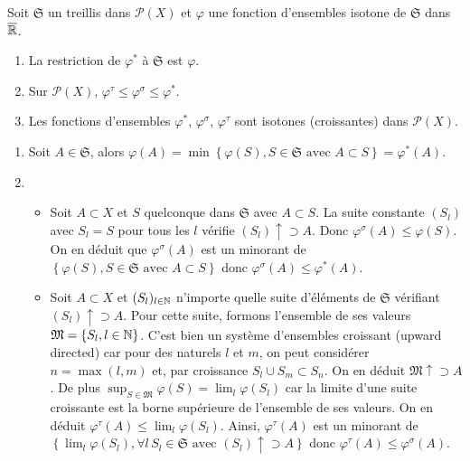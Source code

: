 \begin{prop}
Soit $\mathfrak{S}$ un treillis dans $\mathcal{P}(X)$ et $\varphi$ une fonction d'ensembles isotone de $\mathfrak{S}$ dans $\overline{\mathbb{R}}$.
 \begin{enumerate}
  \item  La restriction de $\varphi^*$ à $\mathfrak{S}$ est $\varphi$.
  \item Sur $\mathcal{P}(X)$, $\varphi^\tau \leq \varphi^\sigma \leq \varphi^*$.
  \item Les fonctions d'ensembles $\varphi^*$, $\varphi^\sigma$, $\varphi^\tau$ sont isotones (croissantes) dans $\mathcal{P}(X)$.
 \end{enumerate}
\end{prop}
\begin{demo}
 \begin{enumerate}
  \item Soit $A \in \mathfrak{S}$, alors $\varphi(A)= \min \left\lbrace \varphi(S), S \in \mathfrak{S} \text{ avec } A \subset S \right\rbrace = \varphi^*(A)$.
  \item \begin{itemize}
         \item Soit $A \subset X$ et $S$ quelconque dans $\mathfrak{S}$ avec $A \subset S$. La suite constante $(S_l)$ avec $S_l = S$ pour tous les $l$ vérifie $(S_l) \uparrow \supset A$. Donc $\varphi^\sigma(A) \leq \varphi(S)$. On en déduit que $\varphi^\sigma(A)$ est un minorant de $\left\lbrace \varphi(S), S \in \mathfrak{S} \text{ avec } A \subset S \right\rbrace$ donc $\varphi^\sigma(A) \leq \varphi^*(A)$.
        \item Soit $A \subset X$ et $(S_l)_{l\in \mathbb{N}}$ n'importe quelle suite d'éléments de $\mathfrak{S}$ vérifiant $(S_l) \uparrow \supset A$. Pour cette suite, formons l'ensemble de ses valeurs $\mathfrak{M}= \left\lbrace S_l, l\in \mathbb{N} \right\rbrace$. C'est bien un système d'ensembles croissant (upward directed) car pour des naturels $l$ et $m$, on peut considérer $n = \max(l,m)$ et, par croissance $S_l \cup S_m \subset S_n$. On en déduit $\mathfrak{M}\uparrow \supset A$. De plus $\sup_{S \in \mathfrak{M}} \varphi(S)=\lim_{l}  \varphi(S_l)$ car la limite d'une suite croissante est la borne supérieure de l'ensemble de ses valeurs. On en déduit $\varphi^\tau (A) \leq \lim_{l}  \varphi(S_l)$. Ainsi, $\varphi^\tau(A)$ est un minorant de $\left\lbrace \lim_{l}  \varphi(S_l), \forall l \, S_l\in \mathfrak{S} \text{ avec } (S_l) \uparrow \supset A \right\rbrace$ donc $\varphi^\tau(A) \leq \varphi^\sigma(A)$.
        \end{itemize}

\end{enumerate}
\end{demo}
